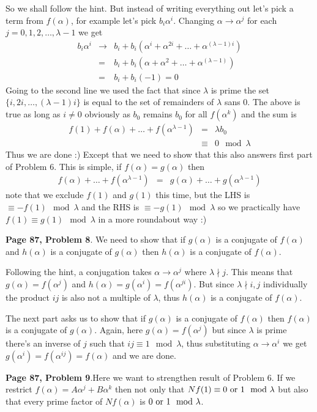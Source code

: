 \documentclass[aps,preprint,preprintnumbers,nofootinbib,showpacs,prd]{revtex4-1}
\newcommand{\nbea}{\begin{eqnarray*}}
\newcommand{\neea}{\end{eqnarray*}}
\begin{document}
So we shall follow the hint. But instead of writing everything out let's pick a term from $f(\alpha)$, for example let's pick $b_i\alpha^i$. Changing $\alpha \to \alpha^j$ for each $j = 0,1,2,\dots,\lambda-1$ we get
%
\nbea
b_i\alpha^i & \to & b_i + b_i(\alpha^{i} + \alpha^{2i} + \dots + \alpha^{(\lambda - 1)i}) \\
& = & b_i + b_i(\alpha + \alpha^{2} + \dots + \alpha^{(\lambda - 1)}) \\
& = & b_i + b_i(-1) = 0
\neea
%
Going to the second line we used the fact that since $\lambda$ is prime the set $\{i, 2i, \dots, (\lambda-1)i\}$ is equal to the set of remainders of $\lambda$ sans 0. The above is true as long as $i \neq 0$ obviously as $b_0$ remains $b_0$ for all $f(\alpha^k)$ and the sum is
%
\nbea
f(1) + f(\alpha) + \dots + f(\alpha^{\lambda-1}) & = & \lambda b_0 \\
& \equiv & 0 \mod{\lambda}
\neea
%
Thus we are done :) Except that we need to show that this also answers first part of Problem 6. This is simple, if $f(\alpha) = g(\alpha)$ then 
%
\nbea
f(\alpha) + \dots + f(\alpha^{\lambda-1}) & = & g(\alpha) + \dots + g(\alpha^{\lambda-1})
\neea
%
note that we exclude $f(1)$ and $g(1)$ this time, but the LHS is $\equiv -f(1) \mod{\lambda}$ and the RHS is $\equiv -g(1)\mod{\lambda}$ so we practically have $f(1) \equiv g(1) \mod{\lambda}$ in a more roundabout way :)

{\bf Page 87, Problem 8}. We need to show that if $g(\alpha)$ is a conjugate of $f(\alpha)$ and $h(\alpha)$ is a conjugate of $g(\alpha)$ then $h(\alpha)$ is a conjugate of $f(\alpha)$.

Following the hint, a conjugation takes $\alpha\to\alpha^j$ where $\lambda\nmid j$. This means that $g(\alpha) = f(\alpha^j)$ and $h(\alpha) = g(\alpha^i) = f(\alpha^{ji})$. But since $\lambda\nmid i,j$ individually the product $ij$ is also not a multiple of $\lambda$, thus $h(\alpha)$ is a conjugate of $f(\alpha)$.

The next part asks us to show that if $g(\alpha)$ is a conjugate of $f(\alpha)$ then $f(\alpha)$ is a conjugate of $g(\alpha)$. Again, here $g(\alpha) = f(\alpha^j)$ but since $\lambda$ is prime there's an inverse of $j$ such that $ij \equiv 1 \mod{\lambda}$, thus substituting $\alpha\to\alpha^i$ we get $g(\alpha^i) = f(\alpha^{ij}) = f(\alpha)$ and we are done.

{\bf Page 87, Problem 9}.Here we want to strengthen result of Problem 6. If we restrict $f(\alpha) = A\alpha^j + B\alpha^k$ then not only that $Nf(1) \equiv 0 {\rm ~or~} 1 \mod{\lambda}$ but also that every prime factor of $Nf(\alpha)$ is $0 {\rm~or~} 1 \mod{\lambda}$.
\end{document}
